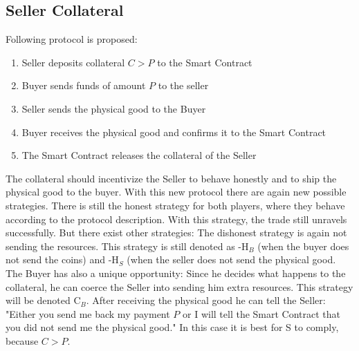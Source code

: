 \documentclass{cacthesis}
\begin{document}
\subsection{Seller Collateral}
Following protocol is proposed:
\begin{enumerate}
    \item Seller deposits collateral $C > P$ to the Smart Contract
    \item Buyer sends funds of amount $P$ to the seller 
    \item Seller sends the physical good to the Buyer
    \item Buyer receives the physical good and confirms it to the Smart Contract
    \item The Smart Contract releases the collateral of the Seller
\end{enumerate}
The collateral should incentivize the Seller to behave honestly and to ship the physical good to the buyer.
With this new protocol there are again new possible strategies. There is still the honest strategy for both players, where they behave according to the protocol description. With this strategy, the trade still unravels successfully.\newline
But there exist other strategies: The dishonest strategy is again not sending the resources. This strategy is still denoted as -H$_B$ (when the buyer does not send the coins) and -H$_S$ (when the seller does not send the physical good.\newline
The Buyer has also a unique opportunity: Since he decides what happens to the collateral, he can coerce the Seller into sending him extra resources. This strategy will be denoted C$_B$.  After receiving the physical good he can tell the Seller: "Either you send me back my payment $P$ or I will tell the Smart Contract that you did not send me the physical good." In this case it is best for S to comply, because $C > P$. \newline




\end{document}
